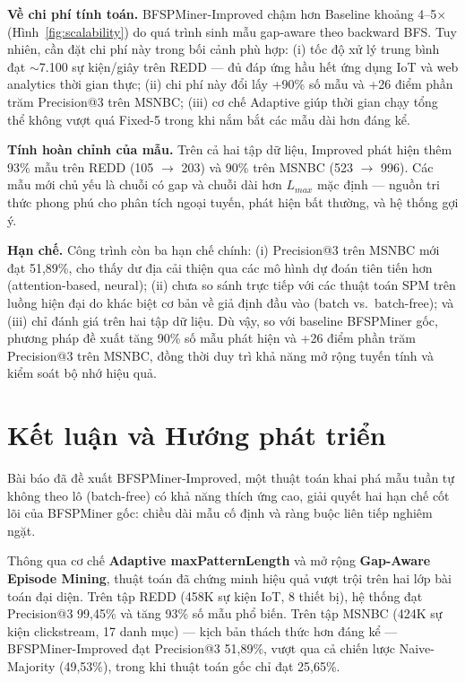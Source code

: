 \documentclass{article}
\begin{document}
\textbf{Về chi phí tính toán.} BFSPMiner-Improved chậm hơn Baseline khoảng 4--5$\times$ (Hình~\ref{fig:scalability}) do quá trình sinh mẫu gap-aware theo backward BFS. Tuy nhiên, cần đặt chi phí này trong bối cảnh phù hợp: (i) tốc độ xử lý trung bình đạt $\sim$7.100 sự kiện/giây trên REDD --- đủ đáp ứng hầu hết ứng dụng IoT và web analytics thời gian thực; (ii) chi phí này đổi lấy +90\% số mẫu và +26 điểm phần trăm Precision@3 trên MSNBC; (iii) cơ chế Adaptive giúp thời gian chạy tổng thể không vượt quá Fixed-5 trong khi nắm bắt các mẫu dài hơn đáng kể.

\textbf{Tính hoàn chỉnh của mẫu.} Trên cả hai tập dữ liệu, Improved phát hiện thêm 93\% mẫu trên REDD (105 $\rightarrow$ 203) và 90\% trên MSNBC (523 $\rightarrow$ 996). Các mẫu mới chủ yếu là chuỗi có gap và chuỗi dài hơn $L_{max}$ mặc định --- nguồn tri thức phong phú cho phân tích ngoại tuyến, phát hiện bất thường, và hệ thống gợi ý.

\textbf{Hạn chế.} Công trình còn ba hạn chế chính: (i) Precision@3 trên MSNBC mới đạt 51,89\%, cho thấy dư địa cải thiện qua các mô hình dự đoán tiên tiến hơn (attention-based, neural); (ii) chưa so sánh trực tiếp với các thuật toán SPM trên luồng hiện đại do khác biệt cơ bản về giả định đầu vào (batch vs.\ batch-free); và (iii) chỉ đánh giá trên hai tập dữ liệu. Dù vậy, so với baseline BFSPMiner gốc, phương pháp đề xuất tăng 90\% số mẫu phát hiện và +26 điểm phần trăm Precision@3 trên MSNBC, đồng thời duy trì khả năng mở rộng tuyến tính và kiểm soát bộ nhớ hiệu quả.

\section{Kết luận và Hướng phát triển}
\label{sec:conclusion}

Bài báo đã đề xuất BFSPMiner-Improved, một thuật toán khai phá mẫu tuần tự không theo lô (batch-free) có khả năng thích ứng cao, giải quyết hai hạn chế cốt lõi của BFSPMiner gốc: chiều dài mẫu cố định và ràng buộc liên tiếp nghiêm ngặt.

Thông qua cơ chế \textbf{Adaptive maxPatternLength} và mở rộng \textbf{Gap-Aware Episode Mining}, thuật toán đã chứng minh hiệu quả vượt trội trên hai lớp bài toán đại diện. Trên tập REDD (458K sự kiện IoT, 8 thiết bị), hệ thống đạt Precision@3 99,45\% và tăng 93\% số mẫu phổ biến. Trên tập MSNBC (424K sự kiện clickstream, 17 danh mục) --- kịch bản thách thức hơn đáng kể --- BFSPMiner-Improved đạt Precision@3 51,89\%, vượt qua cả chiến lược Naive-Majority (49,53\%), trong khi thuật toán gốc chỉ đạt 25,65\%.
\end{document}
